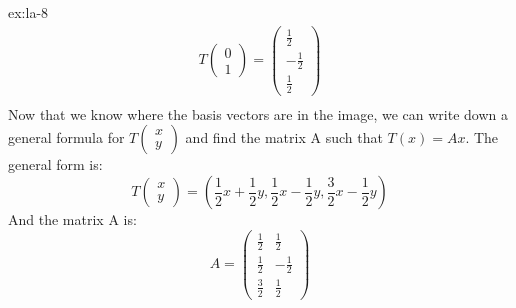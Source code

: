 \begin{solution}{ex:la-8}
\[\begin{gathered}
      T\begin{pmatrix}0\\1\end{pmatrix}=\begin{pmatrix}\frac{1}{2}\\-\frac{1}{2}\\\frac{1}{2}\end{pmatrix} \\
    \end{gathered}
  \]
  Now that we know where the basis vectors are in the image, we can write down a general formula for $T\begin{pmatrix}x\\y\end{pmatrix}$ and find the matrix A such that $T(x)=Ax$. The general form is:
  \[
    T\begin{pmatrix}x\\y\end{pmatrix}=(\frac{1}{2}x+\frac{1}{2}y,\frac{1}{2}x-\frac{1}{2}y,\frac{3}{2}x-\frac{1}{2}y)
  \]
  And the matrix A is:
  \[
    A=\begin{pmatrix}\frac{1}{2}&\frac{1}{2}\\\frac{1}{2}&-\frac{1}{2}\\\frac{3}{2}&\frac{1}{2}\end{pmatrix}
  \]
\end{solution}
